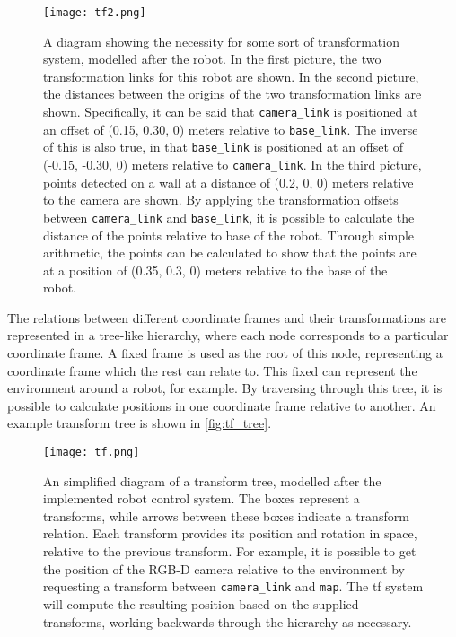 \begin{figure}[!h]
    \centering
    \texttt{[image: tf2.png]}
    \caption{A diagram showing the necessity for some sort of transformation system, modelled after the robot. In the first picture, the two transformation links for this robot are shown. In the second picture, the distances between the origins of the two transformation links are shown. Specifically, it can be said that \texttt{camera\_link} is positioned at an offset of (0.15, 0.30, 0) meters relative to \texttt{base\_link}. The inverse of this is also true, in that \texttt{base\_link} is positioned at an offset of (-0.15, -0.30, 0) meters relative to \texttt{camera\_link}. In the third picture, points detected on a wall at a distance of (0.2, 0, 0) meters relative to the camera are shown. By applying the transformation offsets between \texttt{camera\_link} and \texttt{base\_link}, it is possible to calculate the distance of the points relative to base of the robot. Through simple arithmetic, the points can be calculated to show that the points are at a position of (0.35, 0.3, 0) meters relative to the base of the robot.}
    \label{fig:tf}
\end{figure}

The relations between different coordinate frames and their transformations are represented in a tree-like hierarchy, where each node corresponds to a particular coordinate frame. A fixed frame is used as the root of this node, representing a coordinate frame which the rest can relate to. This fixed can represent the environment around a robot, for example. By traversing through this tree, it is possible to calculate positions in one coordinate frame relative to another. An example transform tree is shown in \autoref{fig:tf_tree}.

\begin{figure}[!h]
    \centering
    \texttt{[image: tf.png]}
    \caption{An simplified diagram of a transform tree, modelled after the implemented robot control system. The boxes represent a transforms, while arrows between these boxes indicate a transform relation. Each transform provides its position and rotation in space, relative to the previous transform. For example, it is possible to get the position of the RGB-D camera relative to the environment by requesting a transform between \texttt{camera\_link} and \texttt{map}. The tf system will compute the resulting position based on the supplied transforms, working backwards through the hierarchy as necessary.}
    \label{fig:tf_tree}
\end{figure}

